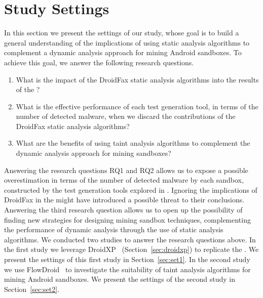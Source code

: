 \section{Study Settings}



In this section
we present the settings of our study, whose goal is to build a general understanding of the implications of using static analysis algorithms
to complement a dynamic analysis approach
for mining Android sandboxes. %
To achieve this goal, we answer the following research questions.

\begin{enumerate}[(RQ1)]
 
 \item What is the impact of the DroidFax static analysis algorithms into the results of the \blls?
  
 \item What is the effective performance of each test generation tool, in terms of the number of detected malware, when we
   discard the contributions of the DroidFax static analysis algorithms?

 \item What are the benefits of using taint
 analysis algorithms to complement the dynamic analysis approach for mining sandboxes?
\end{enumerate}


Answering the research questions RQ1 and RQ2 allows us to expose a possible overestimation in terms of the number of detected malware by each sandbox, constructed by the test
generation tools explored in \blls. Ignoring the implications of DroidFax in the \blls might have introduced a possible threat to their conclusions. Answering the third research question
allows us to open up the possibility of finding new strategies for designing mining sandbox techniques, complementing the performance of
dynamic analysis through the use of static analysis algorithms.
We conducted two studies to answer the research questions above. In the
first study we leverage DroidXP~\cite{DBLP:conf/scam/CostaMCMVBC20} (Section~\ref{sec:droidxp}) to replicate
the \blls. We present the settings of this first study in Section~\ref{sec:set1}.
In the second study we use
FlowDroid~\cite{DBLP:conf/pldi/ArztRFBBKTOM14} to investigate the 
suitability of taint analysis algorithms for mining Android sandboxes.
We present the settings of the second study in Section~\ref{sec:set2}. 


